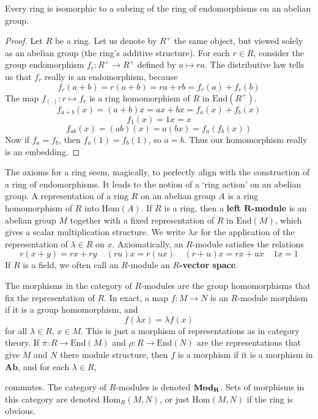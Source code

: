 \begin{theorem}
    Every ring is isomorphic to a subring of the ring of endomorphisms on an abelian group.
\end{theorem}
\begin{proof}
    Let $R$ be a ring. Let us denote by $R^+$ the same object, but viewed solely as an abelian group (the ring's additive structure). For each $r \in R$, consider the group endomorphism $f_r:R^+ \to R^+$ defined by $a \mapsto ra$. The distributive law tells us that $f_r$ really is an endomorphism, because
    \[ f_r(a + b) = r(a + b) = ra + rb = f_r(a) + f_r(b) \]
    The map $f_{(\cdot)}: r \mapsto f_r$ is a ring homomorphism of $R$ in $\text{End}(R^+)$.
    \[  f_{a + b}(x) = (a + b)x = ax + bx = f_a(x) + f_b(x) \]
    \[ f_{1}(x) = 1x = x \]
    \[ f_{ab}(x) = (ab)(x) = a(bx) = f_a(f_b(x)) \]
    Now if $f_a = f_b$, then $f_a(1) = f_b(1)$, so $a = b$. Thus our homomorphism really is an embedding.
\end{proof}

The axioms for a ring seem, magically, to perfectly align with the construction of a  ring of endomorphisms. It leads to the notion of a `ring action' on an abelian group. A representation of a ring $R$ on an abelian group $A$ is a ring homomorphism of $R$ into $\text{Hom}(A)$. If $R$ is a ring, then a {\bf left $\mathbf{R}$-module} is an abelian group $M$ together with a fixed representation of $R$ in $\text{End}(M)$, which gives a scalar multiplication structure. We write $\lambda x$ for the application of the representation of $\lambda \in R$ on $x$. Axiomatically, an $R$-module satisfies the relations
%
\[r(x + y) = rx + ry\ \ \ \ \ (ru) x = r(ux)\ \ \ \ \ (r + u)x = rx + ux\ \ \ \ \ 1x = 1 \]
%
If $R$ is a field, we often call an $R$-module an {\bf $R$-vector space}.

The morphisms in the category of $R$-modules are the group homomorphisms that fix the representation of $R$. In exact, a map $f: M \to N$ is an $R$-module morphism if it is a group homomorphism, and
%
\[ f(\lambda x) = \lambda f(x) \]
%
for all $\lambda \in R$, $x \in M$. This is just a morphism of representations as in category theory. If $\pi: R \to \text{End}(M)$ and $\rho: R \to \text{End}(N)$ are the representations that give $M$ and $N$ there module structure, then $f$ is a morphism if it is a morphism in $\mathbf{Ab}$, and for each $\lambda \in R$,
%
\begin{center}
\end{center}
%
commutes. The category of $R$-modules is denoted $\text{{\bf Mod}}_\mathbf{R}$. Sets of morphisms in this category are denoted $\text{Hom}_R(M,N)$, or just $\text{Hom}(M,N)$ if the ring is obvious.

